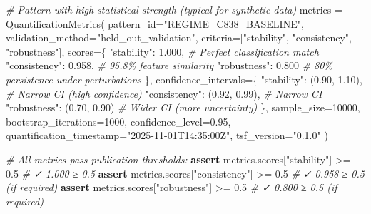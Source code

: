 \documentclass[
]{article}
\newenvironment{Shaded}{}{}
\newcommand{\CommentTok}[1]{\textcolor[rgb]{0.38,0.63,0.69}{\textit{#1}}}
\newcommand{\ControlFlowTok}[1]{\textcolor[rgb]{0.00,0.44,0.13}{\textbf{#1}}}
\newcommand{\DecValTok}[1]{\textcolor[rgb]{0.25,0.63,0.44}{#1}}
\newcommand{\FloatTok}[1]{\textcolor[rgb]{0.25,0.63,0.44}{#1}}
\newcommand{\NormalTok}[1]{#1}
\newcommand{\OperatorTok}[1]{\textcolor[rgb]{0.40,0.40,0.40}{#1}}
\newcommand{\StringTok}[1]{\textcolor[rgb]{0.25,0.44,0.63}{#1}}
\begin{document}
\begin{Shaded}
\begin{Highlighting}[]
\CommentTok{\# Pattern with high statistical strength (typical for synthetic data)}
\NormalTok{metrics }\OperatorTok{=}\NormalTok{ QuantificationMetrics(}
\NormalTok{    pattern\_id}\OperatorTok{=}\StringTok{"REGIME\_C838\_BASELINE"}\NormalTok{,}
\NormalTok{    validation\_method}\OperatorTok{=}\StringTok{"held\_out\_validation"}\NormalTok{,}
\NormalTok{    criteria}\OperatorTok{=}\NormalTok{[}\StringTok{"stability"}\NormalTok{, }\StringTok{"consistency"}\NormalTok{, }\StringTok{"robustness"}\NormalTok{],}
\NormalTok{    scores}\OperatorTok{=}\NormalTok{\{}
        \StringTok{"stability"}\NormalTok{: }\FloatTok{1.000}\NormalTok{,                }\CommentTok{\# Perfect classification match}
        \StringTok{"consistency"}\NormalTok{: }\FloatTok{0.958}\NormalTok{,              }\CommentTok{\# 95.8\% feature similarity}
        \StringTok{"robustness"}\NormalTok{: }\FloatTok{0.800}                \CommentTok{\# 80\% persistence under perturbations}
\NormalTok{    \},}
\NormalTok{    confidence\_intervals}\OperatorTok{=}\NormalTok{\{}
        \StringTok{"stability"}\NormalTok{: (}\FloatTok{0.90}\NormalTok{, }\FloatTok{1.10}\NormalTok{),         }\CommentTok{\# Narrow CI (high confidence)}
        \StringTok{"consistency"}\NormalTok{: (}\FloatTok{0.92}\NormalTok{, }\FloatTok{0.99}\NormalTok{),       }\CommentTok{\# Narrow CI}
        \StringTok{"robustness"}\NormalTok{: (}\FloatTok{0.70}\NormalTok{, }\FloatTok{0.90}\NormalTok{)         }\CommentTok{\# Wider CI (more uncertainty)}
\NormalTok{    \},}
\NormalTok{    sample\_size}\OperatorTok{=}\DecValTok{10000}\NormalTok{,}
\NormalTok{    bootstrap\_iterations}\OperatorTok{=}\DecValTok{1000}\NormalTok{,}
\NormalTok{    confidence\_level}\OperatorTok{=}\FloatTok{0.95}\NormalTok{,}
\NormalTok{    quantification\_timestamp}\OperatorTok{=}\StringTok{"2025{-}11{-}01T14:35:00Z"}\NormalTok{,}
\NormalTok{    tsf\_version}\OperatorTok{=}\StringTok{"0.1.0"}
\NormalTok{)}

\CommentTok{\# All metrics pass publication thresholds:}
\ControlFlowTok{assert}\NormalTok{ metrics.scores[}\StringTok{"stability"}\NormalTok{] }\OperatorTok{\textgreater{}=} \FloatTok{0.5}    \CommentTok{\# ✓ 1.000 ≥ 0.5}
\ControlFlowTok{assert}\NormalTok{ metrics.scores[}\StringTok{"consistency"}\NormalTok{] }\OperatorTok{\textgreater{}=} \FloatTok{0.5}  \CommentTok{\# ✓ 0.958 ≥ 0.5 (if required)}
\ControlFlowTok{assert}\NormalTok{ metrics.scores[}\StringTok{"robustness"}\NormalTok{] }\OperatorTok{\textgreater{}=} \FloatTok{0.5}   \CommentTok{\# ✓ 0.800 ≥ 0.5 (if required)}
\end{Highlighting}
\end{Shaded}
\end{document}
